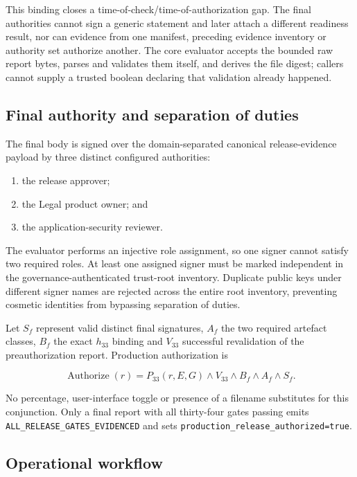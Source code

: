 This binding closes a time-of-check/time-of-authorization gap.  The final
authorities cannot sign a generic statement and later attach a different readiness
result, nor can evidence from one manifest, preceding evidence inventory or
authority set authorize another.  The core evaluator accepts the bounded raw
report bytes, parses and validates them itself, and derives the file digest; callers
cannot supply a trusted boolean declaring that validation already happened.

\subsection{Final authority and separation of duties}

The final body is signed over the domain-separated canonical release-evidence
payload by three distinct configured authorities:

\begin{enumerate}
  \item the release approver;
  \item the Legal product owner; and
  \item the application-security reviewer.
\end{enumerate}

The evaluator performs an injective role assignment, so one signer cannot satisfy
two required roles.  At least one assigned signer must be marked independent in the
governance-authenticated trust-root inventory.  Duplicate public keys under
different signer names are rejected across the entire root inventory, preventing
cosmetic identities from bypassing separation of duties.

Let $S_f$ represent valid distinct final signatures, $A_f$ the two required
artefact classes, $B_f$ the exact $h_{33}$ binding and $V_{33}$ successful
revalidation of the preauthorization report.  Production authorization is

\begin{equation}
  \operatorname{Authorize}(r) =
  P_{33}(r,E,G) \land V_{33} \land B_f \land A_f \land S_f.
\end{equation}

No percentage, user-interface toggle or presence of a filename substitutes for
this conjunction.  Only a final report with all thirty-four gates passing emits
\texttt{ALL\_RELEASE\_GATES\_EVIDENCED} and sets
\texttt{production\_release\_authorized=true}.

\subsection{Operational workflow}

